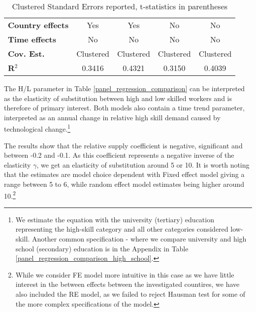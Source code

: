 \documentclass[11pt]{article}
\begin{document}
\begin{table}[!htbp]
\begin{center}
{\begin{tabular}{lcccc}
\textbf{Country effects}                 &            Yes           &      Yes      &    No               &         No         \\
\textbf{Time effects}                 &            No           &      No      &    No               &         No         \\
\textbf{Cov. Est.}               &          Clustered           &    Clustered     &     Clustered     &     Clustered      \\
\textbf{R$^{2}$}  &            0.3416            &      0.4321      &       0.3150      &       0.4039       \\
\bottomrule
\end{tabular}

}
\caption*{\footnotesize Clustered Standard Errors reported, t-statistics in parentheses}
\end{center}
\end{table}

The H/L parameter in Table \ref{panel_regression_comparison} can be interpreted as the elasticity of substitution between high and low skilled workers and is therefore of primary interest. Both models also contain a time trend parameter, interpreted as an annual change in relative high skill demand caused by technological change.\footnote{We estimate the equation with the university (tertiary) education representing the high-skill category and all other categories considered low-skill. Another common specification - where we compare university and high school (secondary) education is in the Appendix in Table \ref{panel_regression_comparison_high_school}.}

The results show that the relative supply coefficient is negative, significant and between -0.2 and -0.1. As this coefficient represents a negative inverse of the elasticity $\gamma$, we get an elasticity of substitution around 5 or 10. %
It is worth noting that the estimates are model choice dependent with Fixed effect model giving a range between 5 to 6, while random effect model estimates being higher around 10.\footnote{While we consider FE model more intuitive in this case as we have little interest in the between effects between the investigated countires, we have also included the RE model, as we failed to reject Hausman test for some of the more complex specifications of the model.}
\end{document}

